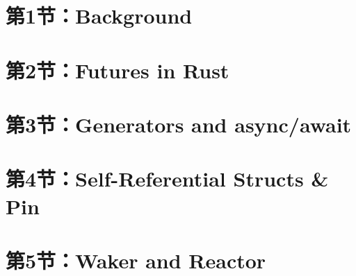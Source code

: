 \section{第1节：Background} %
\section{第2节：Futures in Rust} %
\section{第3节：Generators and async/await} %
\section{第4节：Self-Referential Structs \& Pin} %
\section{第5节：Waker and Reactor} %

